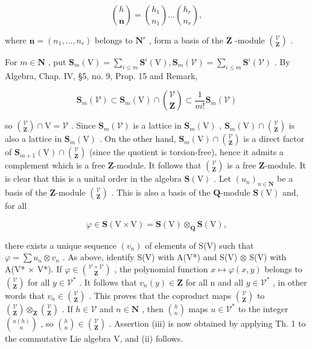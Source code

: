\[
\binom{h}{\mathbf {n}} = \binom{h _ {1}}{n _ {1}} \dots \binom{h _ {r}}{n _ {r}},
\]

where \(\mathbf{n} = (n_1, \ldots, n_r)\) belongs to \(\mathbf{N}^r\) , form a basis of the \(\mathbf{Z}\) -module \(\binom{\mathcal{V}}{\mathbf{Z}}\) .

For \(m \in \mathbf{N}\) , put \(\mathbf{S}_{m}(\mathrm{V}) = \sum_{i \leq m} \mathbf{S}^{i}(\mathrm{V}), \mathbf{S}_{m}(\mathcal{V}) = \sum_{i \leq m} \mathbf{S}^{i}(\mathcal{V})\) . By Algebra, Chap. IV, §5, no. 9, Prop. 15 and Remark,

\[
\mathbf {S} _ {m} (\mathcal {V}) \subset \mathbf {S} _ {m} (\mathrm{V}) \cap \binom{\mathcal {V}}{\mathbf {Z}} \subset \frac {1}{m !} \mathbf {S} _ {m} (\mathcal {V})
\]

so \(\binom{\mathcal{V}}{\mathbf{Z}}\cap\mathrm{V}=\mathcal{V}\) . Since \(\mathbf{S}_{m}(\mathcal{V})\) is a lattice in \(\mathbf{S}_{m}(\mathrm{V})\) , \(\mathbf{S}_{m}(\mathrm{V})\cap\binom{\mathcal{V}}{\mathbf{Z}}\) is also a lattice in \(\mathbf{S}_{m}(\mathrm{V})\) . On the other hand, \(\mathbf{S}_{m}(\mathrm{V})\cap\binom{\mathcal{V}}{\mathbf{Z}}\) is a direct factor of \(\mathbf{S}_{m+1}(\mathrm{V})\cap\binom{\mathcal{V}}{\mathbf{Z}}\) (since the quotient is torsion-free), hence it admits a complement which is a free \(\mathbf{Z}\)-module. It follows that \(\binom{\mathcal{V}}{\mathbf{Z}}\) is a free \(\mathbf{Z}\)-module. It is clear that this is a unital order in the algebra \(\mathbf{S}(\mathrm{V})\) . Let \((u_{n})_{n\in\mathbf{N}}\) be a basis of the \(\mathbf{Z}\)-module \(\binom{\mathcal{V}}{\mathbf{Z}}\) . This is also a basis of the \(\mathbf{Q}\)-module \(\mathbf{S}(\mathrm{V})\) and, for all

\[
\varphi \in \mathbf {S} (\mathrm{V} \times \mathrm{V}) = \mathbf {S} (\mathrm{V}) \otimes_ {\mathbf {Q}} \mathbf {S} (\mathrm{V}),
\]

there exists a unique sequence \((v_{n})\) of elements of S(V) such that \(\varphi=\sum u_{n}\otimes v_{n}\) . As above, identify S(V) with A(V*) and S(V) \(\otimes\) S(V) with A(V* × V*). If \(\varphi\in\binom{\mathcal{V}\times\mathcal{V}}{\mathbf{Z}}\) , the polynomial function \(x\mapsto\varphi(x,y)\) belongs to \(\binom{\mathcal{V}}{\mathbf{Z}}\) for all \(y\in\mathcal{V}^{*}\) . It follows that \(v_{n}(y)\in\mathbf{Z}\) for all n and all \(y\in\mathcal{V}^{*}\) , in other words that \(v_{n}\in\binom{\mathcal{V}}{\mathbf{Z}}\) . This proves that the coproduct maps \(\binom{\mathcal{V}}{\mathbf{Z}}\) to \(\binom{\mathcal{V}}{\mathbf{Z}}\otimes_{\mathbf{Z}}\binom{\mathcal{V}}{\mathbf{Z}}\) . If \(h\in\mathcal{V}\) and \(n\in\mathbf{N}\) , then \(\binom{h}{n}\) maps \(u\in\mathcal{V}^{*}\) to the integer \(\binom{u(h)}{n}\) , so \(\binom{h}{n}\in\binom{\mathcal{V}}{\mathbf{Z}}\) . Assertion (iii) is now obtained by applying Th. 1 to the commutative Lie algebra V, and (ii) follows.

